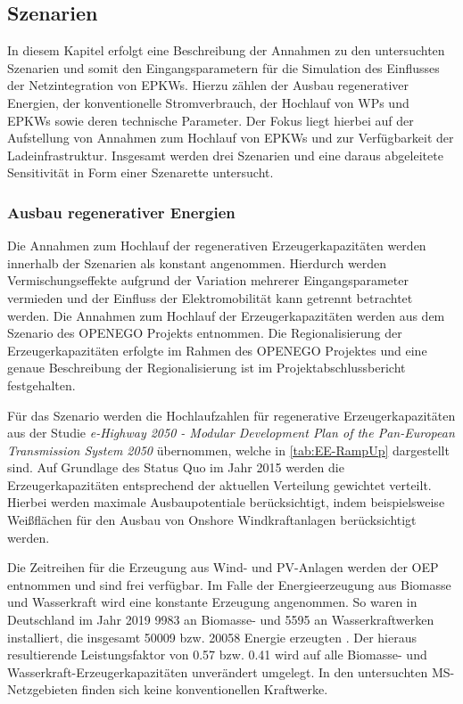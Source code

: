 \subsection{Szenarien}

In diesem Kapitel erfolgt eine Beschreibung der Annahmen zu den untersuchten Szenarien und somit den Eingangsparametern für die Simulation des Einflusses der Netzintegration von \glspl{EPKW}.
Hierzu zählen der Ausbau regenerativer Energien, der konventionelle Stromverbrauch, der Hochlauf von \glspl{WP} und \glspl{EPKW} sowie deren technische Parameter.
Der Fokus liegt hierbei auf der Aufstellung von Annahmen zum Hochlauf von \glspl{EPKW} und zur Verfügbarkeit der Ladeinfrastruktur.
Insgesamt werden drei Szenarien und eine daraus abgeleitete Sensitivität in Form einer Szenarette untersucht.


\subsubsection{Ausbau regenerativer Energien}

Die Annahmen zum Hochlauf der regenerativen Erzeugerkapazitäten werden innerhalb der Szenarien als konstant angenommen.
Hierdurch werden Vermischungseffekte aufgrund der Variation mehrerer Eingangsparameter vermieden und der Einfluss der Elektromobilität kann getrennt betrachtet werden.
Die Annahmen zum Hochlauf der Erzeugerkapazitäten werden aus dem Szenario \ego des \gls{OPENEGO} Projekts entnommen.
Die Regionalisierung der Erzeugerkapazitäten erfolgte im Rahmen des \gls{OPENEGO} Projektes und eine genaue Beschreibung der Regionalisierung ist im Projektabschlussbericht \cite{Mueller2019} festgehalten.\medskip

Für das Szenario \ego werden die Hochlaufzahlen für regenerative Erzeugerkapazitäten aus der Studie \textit{e-Highway 2050 - Modular Development Plan of the Pan-European Transmission System 2050} \cite{EEHPG2015} übernommen, welche in \autoref{tab:EE-RampUp} dargestellt sind.
Auf Grundlage des Status Quo im Jahr \num{2015} werden die Erzeugerkapazitäten entsprechend der aktuellen Verteilung gewichtet verteilt.
Hierbei werden maximale Ausbaupotentiale berücksichtigt, indem beispielsweise Weißflächen für den Ausbau von Onshore Windkraftanlagen berücksichtigt werden.



Die Zeitreihen für die Erzeugung aus Wind- und \gls{PV}-Anlagen werden der \gls{OEP} \cite{OEP} entnommen und sind frei verfügbar.
Im Falle der Energieerzeugung aus Biomasse und Wasserkraft wird eine konstante Erzeugung angenommen.
So waren in Deutschland im Jahr \num{2019} \SI{9983}{\mw} an Biomasse- und \SI{5595}{\mw} an Wasserkraftwerken installiert, die insgesamt \SI{50009}{\gwh} bzw. \SI{20058}{\gwh} Energie erzeugten \cite{BMWi2020}.
Der hieraus resultierende Leistungsfaktor von \num{0.57} bzw. \num{0.41} wird auf alle Biomasse- und Wasserkraft-Erzeugerkapazitäten unverändert umgelegt.
In den untersuchten \gls{MS}-Netzgebieten finden sich keine konventionellen Kraftwerke.


